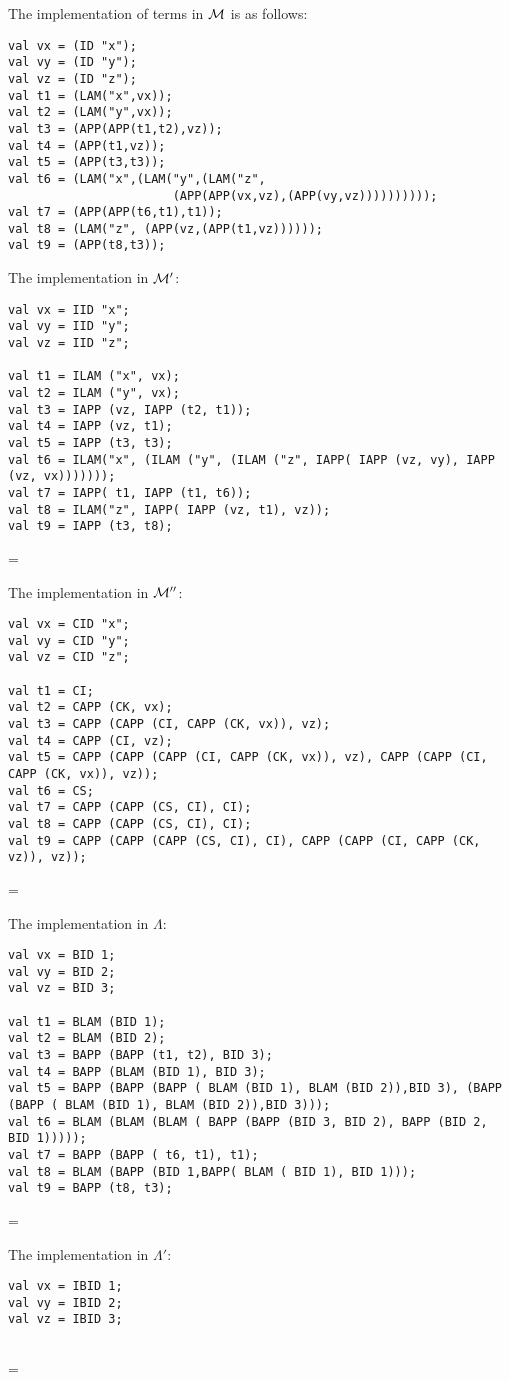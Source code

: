 \documentclass[11pt]{article}
\newenvironment{neverbreak} %
{\par\nobreak\vfil\penalty0\vfilneg
	\vtop\bgroup}
{\par\xdef\tpd{\the\prevdepth}\egroup
	\prevdepth=\tpd}
\begin{document}
\begin{enumerate}
\noindent
The implementation of terms in ${\cal M}$ is as follows:
\begin{verbatim}
val vx = (ID "x");
val vy = (ID "y");
val vz = (ID "z");
val t1 = (LAM("x",vx));
val t2 = (LAM("y",vx));
val t3 = (APP(APP(t1,t2),vz));
val t4 = (APP(t1,vz));
val t5 = (APP(t3,t3));
val t6 = (LAM("x",(LAM("y",(LAM("z",
                       (APP(APP(vx,vz),(APP(vy,vz))))))))));
val t7 = (APP(APP(t6,t1),t1));
val t8 = (LAM("z", (APP(vz,(APP(t1,vz))))));
val t9 = (APP(t8,t3));
\end{verbatim}

\vspace{1cm}
\begin{neverbreak}
The implementation in ${\cal M}'$:
\begin{verbatim}
val vx = IID "x";
val vy = IID "y";
val vz = IID "z";

val t1 = ILAM ("x", vx);
val t2 = ILAM ("y", vx);
val t3 = IAPP (vz, IAPP (t2, t1));
val t4 = IAPP (vz, t1);
val t5 = IAPP (t3, t3);
val t6 = ILAM("x", (ILAM ("y", (ILAM ("z", IAPP( IAPP (vz, vy), IAPP (vz, vx)))))));
val t7 = IAPP( t1, IAPP (t1, t6));
val t8 = ILAM("z", IAPP( IAPP (vz, t1), vz));
val t9 = IAPP (t3, t8);
\end{verbatim}
\end{neverbreak}
\vspace{1cm}
\begin{neverbreak}
The implementation in ${\cal M}''$:
\begin{verbatim}
val vx = CID "x";
val vy = CID "y";
val vz = CID "z";

val t1 = CI;
val t2 = CAPP (CK, vx);
val t3 = CAPP (CAPP (CI, CAPP (CK, vx)), vz);
val t4 = CAPP (CI, vz);
val t5 = CAPP (CAPP (CAPP (CI, CAPP (CK, vx)), vz), CAPP (CAPP (CI, CAPP (CK, vx)), vz));
val t6 = CS;
val t7 = CAPP (CAPP (CS, CI), CI);
val t8 = CAPP (CAPP (CS, CI), CI);
val t9 = CAPP (CAPP (CAPP (CS, CI), CI), CAPP (CAPP (CI, CAPP (CK, vz)), vz));
\end{verbatim}
\end{neverbreak}
\vspace{1cm}
\begin{neverbreak}
The implementation in $\Lambda$:
\begin{verbatim}
val vx = BID 1;
val vy = BID 2;
val vz = BID 3;

val t1 = BLAM (BID 1);
val t2 = BLAM (BID 2);
val t3 = BAPP (BAPP (t1, t2), BID 3);
val t4 = BAPP (BLAM (BID 1), BID 3);
val t5 = BAPP (BAPP (BAPP ( BLAM (BID 1), BLAM (BID 2)),BID 3), (BAPP (BAPP ( BLAM (BID 1), BLAM (BID 2)),BID 3)));
val t6 = BLAM (BLAM (BLAM ( BAPP (BAPP (BID 3, BID 2), BAPP (BID 2, BID 1)))));
val t7 = BAPP (BAPP ( t6, t1), t1);
val t8 = BLAM (BAPP (BID 1,BAPP( BLAM ( BID 1), BID 1)));
val t9 = BAPP (t8, t3);
\end{verbatim}
\end{neverbreak}
\vspace{1cm}
\begin{neverbreak}
The implementation in $\Lambda'$:
\begin{verbatim}
val vx = IBID 1;
val vy = IBID 2;
val vz = IBID 3;


\end{verbatim}
\end{neverbreak}
\end{enumerate}
\end{document}
